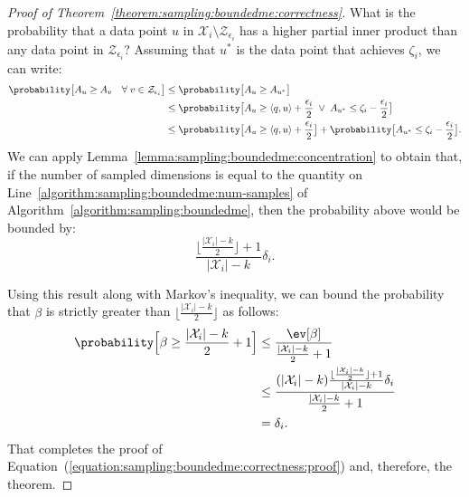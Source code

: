 \begin{proof}[Proof of Theorem~\ref{theorem:sampling:boundedme:correctness}]
    What is the probability that a data point $u$ in $\mathcal{X}_i \setminus \mathcal{Z}_{\epsilon_i}$
    has a higher partial inner product than any data point in $\mathcal{Z}_{\epsilon_i}$?
    Assuming that $u^\ast$ is the data point that achieves $\zeta_i$, we can write:
    \begin{align*}
        \probability\big[ A_u \geq A_v \quad \forall \; v \in \mathcal{Z}_{\epsilon_i} \big]
        &\leq \probability\big[ A_u \geq A_{u^\ast} \big] \\
        &\leq \probability\big[
            A_u \geq \langle q, u \rangle + \frac{\epsilon_i}{2} \;\lor\;
            A_{u^\ast} \leq \zeta_i - \frac{\epsilon_i}{2}
        \big] \\
        &\leq \probability\big[
            A_u \geq \langle q, u \rangle + \frac{\epsilon_i}{2} \big]
        + \probability\big[
            A_{u^\ast} \leq \zeta_i - \frac{\epsilon_i}{2}
        \big].
    \end{align*}
    We can apply Lemma~\ref{lemma:sampling:boundedme:concentration} to obtain that,
    if the number of sampled dimensions is equal to the quantity on
    Line~\ref{algorithm:sampling:boundedme:num-samples} of
    Algorithm~\ref{algorithm:sampling:boundedme}, then the probability above
    would be bounded by:
    \begin{equation*}
        \frac{\lfloor \frac{\lvert \mathcal{X}_i \rvert - k}{2} \rfloor + 1}{\lvert \mathcal{X}_i \rvert - k} \delta_i.
    \end{equation*}

    Using this result along with Markov's inequality, we can bound the probability that
    $\beta$ is strictly greater than $\lfloor \frac{\lvert \mathcal{X}_i \rvert - k}{2} \rfloor$
    as follows:
    \begin{align*}
        \probability\Big[ \beta \geq \frac{\lvert \mathcal{X}_i \rvert - k}{2} + 1 \Big]
        &\leq \frac{\ev[\beta]}{\frac{\lvert \mathcal{X}_i \rvert - k}{2} + 1} \\
        &\leq \frac{ (\lvert \mathcal{X}_i \rvert - k) \frac{\lfloor \frac{\lvert \mathcal{X}_i \rvert - k}{2} \rfloor + 1}{\lvert \mathcal{X}_i \rvert - k} \delta_i }{\frac{\lvert \mathcal{X}_i \rvert - k}{2} + 1} \\
        &= \delta_i.
    \end{align*}
    That completes the proof of Equation~(\ref{equation:sampling:boundedme:correctness:proof})
    and, therefore, the theorem.
\end{proof}

